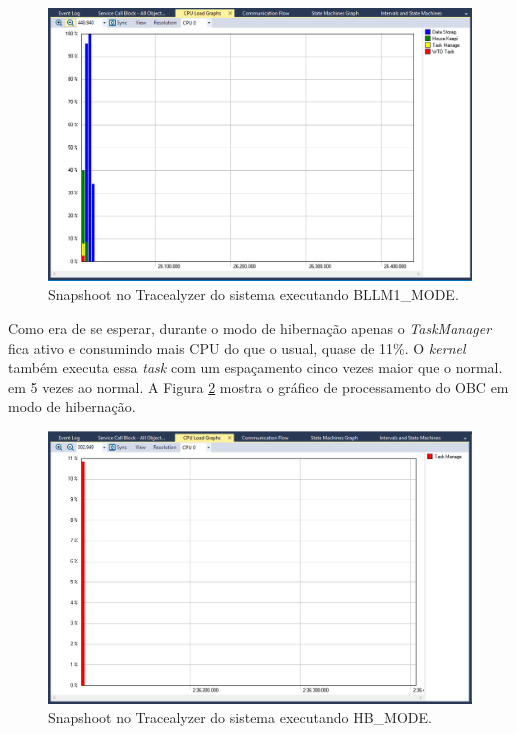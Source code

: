 \begin{figure}[h]
	\centering
	\caption{Snapshoot no Tracealyzer do sistema executando BLLM1\_MODE.}
	\includegraphics[keepaspectratio=true,scale=0.49]{figuras/trace_snapshoot_5.PNG}
	
	\label{trace_snapshoot_5}
\end{figure}

Como era de se esperar, durante o modo de hibernação apenas o \textit{TaskManager} fica ativo e consumindo mais CPU do que o usual, quase de 11\%. O \textit{kernel} também executa essa \textit{task} com um espaçamento cinco vezes maior que o normal. em 5 vezes ao normal. A Figura \ref{trace_snapshoot_4} mostra o gráfico de processamento do OBC em modo de hibernação.


\begin{figure}[h]
	\centering
	\caption{Snapshoot no Tracealyzer do sistema executando HB\_MODE.}
	\includegraphics[keepaspectratio=true,scale=0.41]{figuras/trace_snapshoot_4.PNG}
	
	\label{trace_snapshoot_4}
\end{figure}

